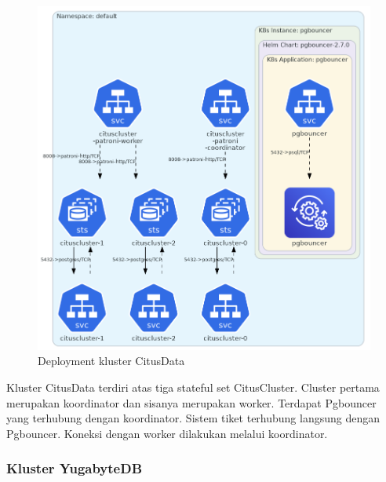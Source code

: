 \begin{figure}[htbp]
    \centering
    \includegraphics[width=1\textwidth]{resources/chapter-4/citusdata.png}
    \caption{Deployment kluster CitusData}
    \label{fig:deployment-citusdata}
\end{figure}

Kluster CitusData terdiri atas tiga stateful set CitusCluster. Cluster pertama merupakan koordinator dan sisanya merupakan worker. Terdapat Pgbouncer yang terhubung dengan koordinator. Sistem tiket terhubung langsung dengan Pgbouncer. Koneksi dengan worker dilakukan melalui koordinator.

\pagebreak

\subsubsection{Kluster YugabyteDB}

